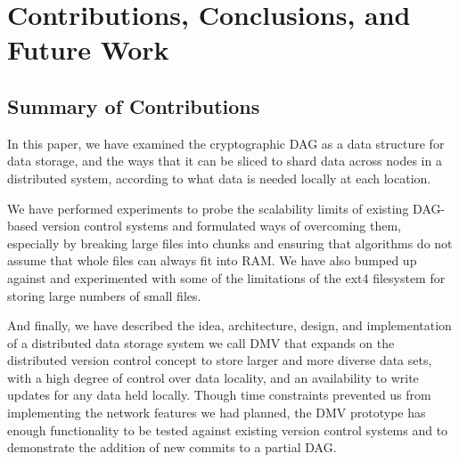 \chapter{Contributions, Conclusions, and Future Work}


\section{Summary of Contributions}

In this paper, we have examined the cryptographic \acrfull{DAG} as a data
structure for data storage, and the ways that it can be sliced to shard data
across nodes in a distributed system, according to what data is needed locally
at each location.

We have performed experiments to probe the scalability limits of existing
\gls{DAG}-based version control systems and formulated ways of overcoming them,
especially by breaking large files into chunks and ensuring that algorithms do
not assume that whole files can always fit into RAM. We have also bumped up
against and experimented with some of the limitations of the ext4 filesystem for
storing large numbers of small files.

And finally, we have described the idea, architecture, design, and
implementation of a distributed data storage system we call \gls{DMV} that
expands on the distributed version control concept to store larger and more
diverse data sets, with a high degree of control over data locality, and an
availability to write updates for any data held locally. Though time constraints
prevented us from implementing the network features we had planned, the
\gls{DMV} prototype has enough functionality to be tested against existing
version control systems and to demonstrate the addition of new \glspl{commit} to
a partial \gls{DAG}.

